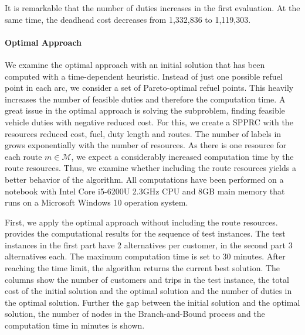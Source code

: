 It is remarkable that the number of duties increases in the first evaluation. At the same time, the deadhead cost decreases from 1,332,836 to 1,119,303.

\paragraph{Optimal Approach} \parfill

We examine the optimal approach with an initial solution that has been computed with a time-dependent heuristic. Instead of just one possible refuel point in each arc, we consider a set of Pareto-optimal refuel points. This heavily increases the number of feasible duties and therefore the computation time. A great issue in the optimal approach is solving the subproblem, \ie finding feasible vehicle duties with negative reduced cost. For this, we create a SPPRC with the resources reduced cost, fuel, duty length and routes. The number of labels in  grows exponentially with the number of resources. As there is one resource for each route ${m\in\mathcal{M}}$, we expect a considerably increased computation time by the route resources. Thus, we examine whether including the route resources yields a better behavior of the algorithm. All computations have been performed on a notebook with Intel Core i5-6200U 2.3GHz CPU and 8GB main memory that runs on a Microsoft Windows 10 operation system.

First, we apply the optimal approach without including the route resources.  provides the computational results for the sequence of test instances. The test instances in the first part have 2 alternatives per customer, in the second part 3 alternatives each. The maximum computation time is set to 30 minutes. After reaching the time limit, the algorithm returns the current best solution. The columns show the number of customers and trips in the test instance, the total cost of the initial solution and the optimal solution and the number of duties in the optimal solution. Further the gap between the initial solution and the optimal solution, the number of nodes in the Branch-and-Bound process and the computation time in minutes is shown.

